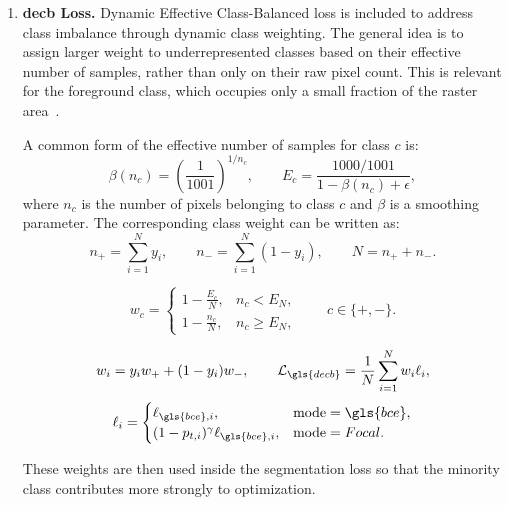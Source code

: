 \begin{enumerate}
    \item \textbf{\gls{decb} Loss.} Dynamic Effective Class-Balanced loss is included to address class imbalance through dynamic class weighting. The general idea is to assign larger weight to underrepresented classes based on their effective number of samples, rather than only on their raw pixel count. This is relevant for the foreground class, which occupies only a small fraction of the raster area~\cite{zhou_dynamic_2023}.

    A common form of the effective number of samples for class $c$ is:
    \begin{equation}
        \beta(n_c)
        =
        \left(\frac{1}{1001}\right)^{1/n_c},
        \qquad
        E_c
        =
        \frac{1000/1001}{1-\beta(n_c)+\epsilon},
    \end{equation}
    where $n_c$ is the number of pixels belonging to class $c$ and $\beta$ is a smoothing parameter. The corresponding class weight can be written as:
    \begin{equation}
        n_{+}=\sum_{i=1}^{N}y_i,
        \qquad
        n_{-}=\sum_{i=1}^{N}(1-y_i),
        \qquad
        N=n_{+}+n_{-}.
    \end{equation}

    \begin{equation}
        w_c
        =
        \begin{cases}
        1-\frac{E_c}{N}, & n_c < E_N,\\
        1-\frac{n_c}{N}, & n_c \geq E_N,
        \end{cases}
        \qquad
        c\in\{+,-\}.
    \end{equation}

    \begin{equation}
        w_i = y_i w_{+} + (1-y_i)w_{-},
        \qquad
        \mathcal{L}_{\gls{decb}}
        =
        \frac{1}{N}\sum_{i=1}^{N}w_i \ell_i,
    \end{equation}
    \begin{equation}
        \ell_i
        =
        \begin{cases}
        \ell_{\gls{bce},i}, & \text{mode}=\gls{bce},\\
        (1-p_{t,i})^\gamma \ell_{\gls{bce},i}, & \text{mode}=Focal.
        \end{cases}
    \end{equation}

    These weights are then used inside the segmentation loss so that the minority class contributes more strongly to optimization.
\end{enumerate}

